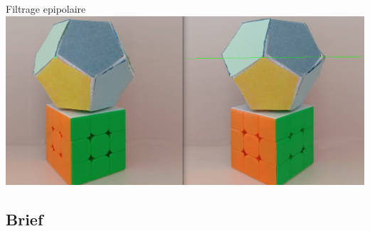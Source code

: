 \begin{frame}{Filtrage epipolaire}
  \includegraphics[width=\linewidth]{capture/corresp.png}\\[0.5em]
\end{frame}


\subsection{Brief}

